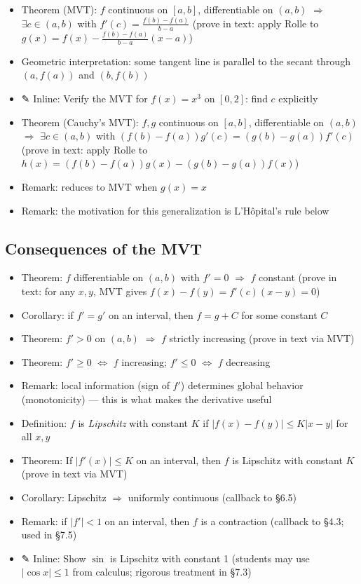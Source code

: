 \documentclass[
  10pt,
  letterpaper,
]{scrbook}
\providecommand{\tightlist}{%
  \setlength{\itemsep}{0pt}\setlength{\parskip}{0pt}}
\begin{document}
\begin{itemize}
\tightlist
\item
  Theorem (MVT): \(f\) continuous on \([a,b]\), differentiable on
  \((a,b)\) \(\Longrightarrow\) \(\exists c \in (a,b)\) with
  \(f'(c) = \frac{f(b) - f(a)}{b - a}\) (prove in text: apply Rolle to
  \(g(x) = f(x) - \frac{f(b)-f(a)}{b-a}(x - a)\))
\item
  Geometric interpretation: some tangent line is parallel to the secant
  through \((a, f(a))\) and \((b, f(b))\)
\item
  ✎ Inline: Verify the MVT for \(f(x) = x^3\) on \([0, 2]\): find \(c\)
  explicitly
\item
  Theorem (Cauchy's MVT): \(f, g\) continuous on \([a,b]\),
  differentiable on \((a,b)\) \(\Longrightarrow\)
  \(\exists c \in (a,b)\) with
  \((f(b) - f(a))g'(c) = (g(b) - g(a))f'(c)\) (prove in text: apply
  Rolle to \(h(x) = (f(b)-f(a))g(x) - (g(b)-g(a))f(x)\))
\item
  Remark: reduces to MVT when \(g(x) = x\)
\item
  Remark: the motivation for this generalization is L'Hôpital's rule
  below
\end{itemize}

\subsection{Consequences of the MVT}\label{consequences-of-the-mvt}

\begin{itemize}
\tightlist
\item
  Theorem: \(f\) differentiable on \((a,b)\) with \(f' = 0\)
  \(\Longrightarrow\) \(f\) constant (prove in text: for any \(x, y\),
  MVT gives \(f(x) - f(y) = f'(c)(x-y) = 0\))
\item
  Corollary: if \(f' = g'\) on an interval, then \(f = g + C\) for some
  constant \(C\)
\item
  Theorem: \(f' > 0\) on \((a,b)\) \(\Longrightarrow\) \(f\) strictly
  increasing (prove in text via MVT)
\item
  Theorem: \(f' \geq 0\) \(\Longleftrightarrow\) \(f\) increasing;
  \(f' \leq 0\) \(\Longleftrightarrow\) \(f\) decreasing
\item
  Remark: local information (sign of \(f'\)) determines global behavior
  (monotonicity) --- this is what makes the derivative useful
\item
  Definition: \(f\) is \emph{Lipschitz} with constant \(K\) if
  \(|f(x) - f(y)| \leq K|x - y|\) for all \(x, y\)
\item
  Theorem: If \(|f'(x)| \leq K\) on an interval, then \(f\) is Lipschitz
  with constant \(K\) (prove in text via MVT)
\item
  Corollary: Lipschitz \(\Longrightarrow\) uniformly continuous
  (callback to §6.5)
\item
  Remark: if \(|f'| < 1\) on an interval, then \(f\) is a contraction
  (callback to §4.3; used in §7.5)
\item
  ✎ Inline: Show \(\sin\) is Lipschitz with constant 1 (students may use
  \(|\cos x| \leq 1\) from calculus; rigorous treatment in §7.3)
\end{itemize}
\end{document}
